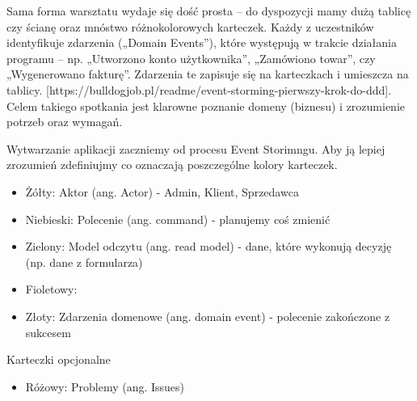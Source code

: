\documentclass{article}
\begin{document}
      Sama forma warsztatu wydaje się dość prosta – do dyspozycji mamy dużą tablicę czy ścianę oraz mnóstwo różnokolorowych karteczek. Każdy z uczestników identyfikuje zdarzenia („Domain Events”), które występują w trakcie działania programu – np. „Utworzono konto użytkownika”, „Zamówiono towar”, czy „Wygenerowano fakturę”. Zdarzenia te zapisuje się na karteczkach i umieszcza na tablicy. [https://bulldogjob.pl/readme/event-storming-pierwszy-krok-do-ddd]. Celem takiego spotkania jest klarowne poznanie domeny (biznesu) i zrozumienie potrzeb oraz wymagań. 

      Wytwarzanie aplikacji zaczniemy od procesu Event Storimngu. Aby ją lepiej zrozumień zdefiniujmy co oznaczają poszczególne kolory karteczek.
      \begin{itemize}
            \item Żółty: Aktor (ang. Actor) - Admin, Klient, Sprzedawca
            \item Niebieski: Polecenie (ang. command) - planujemy coś zmienić
            \item Zielony: Model odczytu (ang. read model) - dane, które wykonują decyzję (np. dane z formularza)
            \item Fioletowy: 
            \item Złoty: Zdarzenia domenowe (ang. domain event) - polecenie zakończone z sukcesem
      \end{itemize}
      Karteczki opcjonalne
      \begin{itemize}
            \item Różowy: Problemy (ang. Issues)
      \end{itemize}
\end{document}
